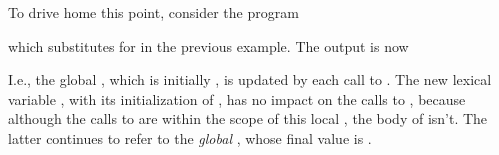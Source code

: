 To drive home this point, consider the program


\n which substitutes  for  in
the previous example.  The output is now


\n I.e., the global , which is initially
, is updated by each call to .
The new lexical variable , with its
initialization of , has no impact on the calls to
, because although the calls to
 are within the scope of this local
, the body of  isn’t.  The
latter continues to refer to the {\em global}
, whose final value is .



